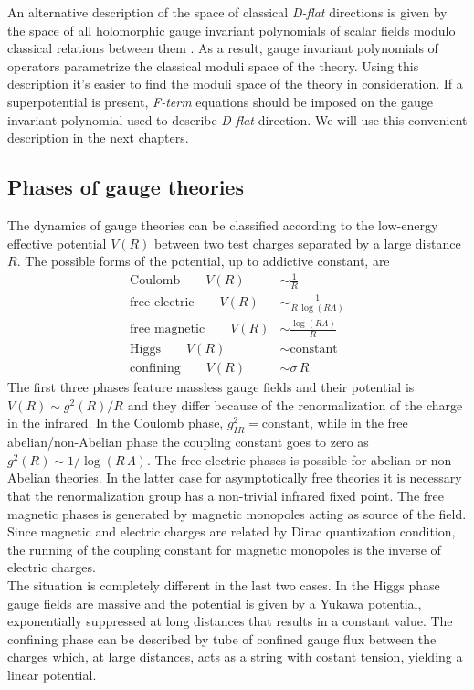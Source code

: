 An alternative description of the space of classical \emph{D-flat} directions is given by the space of all holomorphic gauge invariant polynomials of scalar fields modulo classical relations between them \cite{Luty:1995sd}.
As a result, gauge invariant polynomials of operators parametrize the classical moduli space of the theory. 
Using this description it's easier to find the moduli space of the theory in consideration.
If a superpotential is present, \emph{F-term} equations should be imposed on the gauge invariant polynomial used to describe \emph{D-flat} direction.
We will use this convenient description in the next chapters.










\subsection{Phases of gauge theories}
The dynamics of gauge theories can be classified according to the low-energy effective potential $V(R)$ between two test charges separated by a large distance $R$.
The possible forms of the potential, up to addictive constant, are
\begin{align}
\text{Coulomb} \qquad V(R) & \sim \frac{1}{R} \\
\text{free electric} \qquad V(R) & \sim \frac{1}{R \, \log(R \Lambda) } \\
\text{free magnetic} \qquad V(R) & \sim \frac{\log(R \Lambda)}{R \,  }\\
\text{Higgs} \qquad V(R) & \sim \text{constant} \\
\text{confining} \qquad V(R) & \sim  \sigma \, R  
\end{align}
The first three phases feature massless gauge fields and their potential is $V(R) \sim g^2(R) / R$ and they differ because of the renormalization of the charge in the infrared.
In the Coulomb phase, $g^2_{IR} = \text{constant}$, while in the free abelian/non-Abelian phase the coupling constant goes to zero as $g^2(R) \sim 1/ \log(R \, \Lambda)$.
The free electric phases is possible for abelian or non-Abelian theories.
In the latter case for asymptotically free theories it is necessary that the renormalization group has a non-trivial infrared fixed point.
The free magnetic phases is generated by magnetic monopoles acting as source of the field. Since magnetic and electric charges are related by Dirac quantization condition, the running of the coupling constant for magnetic monopoles is the inverse of electric charges.\\
The situation is completely different in the last two cases.
In the Higgs phase gauge fields are massive and the potential is given by a Yukawa potential, exponentially suppressed at long distances that results in a constant value.
The confining phase can be described by tube of confined gauge flux between the charges which, at large distances, acts as a string with costant tension, yielding a linear potential.


